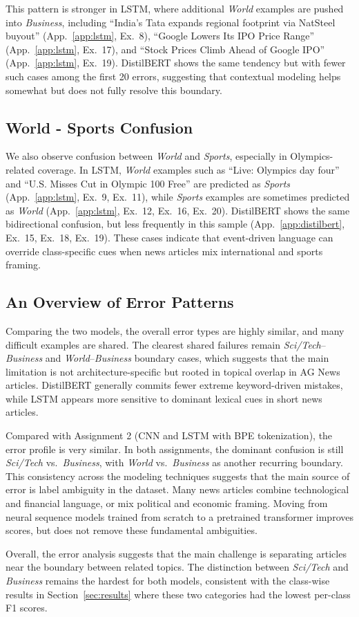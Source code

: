 This pattern is stronger in LSTM, where additional \textit{World} examples are pushed into \textit{Business}, including ``India's Tata expands regional footprint via NatSteel buyout'' (App.~\ref{app:lstm}, Ex.~8), ``Google Lowers Its IPO Price Range'' (App.~\ref{app:lstm}, Ex.~17), and ``Stock Prices Climb Ahead of Google IPO'' (App.~\ref{app:lstm}, Ex.~19). DistilBERT shows the same tendency but with fewer such cases among the first 20 errors, suggesting that contextual modeling helps somewhat but does not fully resolve this boundary.

\subsection{World - Sports Confusion}

We also observe confusion between \textit{World} and \textit{Sports}, especially in Olympics-related coverage. In LSTM, \textit{World} examples such as ``Live: Olympics day four'' and ``U.S. Misses Cut in Olympic 100 Free'' are predicted as \textit{Sports} (App.~\ref{app:lstm}, Ex.~9, Ex.~11), while \textit{Sports} examples are sometimes predicted as \textit{World} (App.~\ref{app:lstm}, Ex.~12, Ex.~16, Ex.~20). DistilBERT shows the same bidirectional confusion, but less frequently in this sample (App.~\ref{app:distilbert}, Ex.~15, Ex.~18, Ex.~19). These cases indicate that event-driven language can override class-specific cues when news articles mix international and sports framing.

\subsection{An Overview of Error Patterns}

Comparing the two models, the overall error types are highly similar, and many difficult examples are shared. The clearest shared failures remain \textit{Sci/Tech}--\textit{Business} and \textit{World}--\textit{Business} boundary cases, which suggests that the main limitation is not architecture-specific but rooted in topical overlap in AG News articles. DistilBERT generally commits fewer extreme keyword-driven mistakes, while LSTM appears more sensitive to dominant lexical cues in short news articles.

Compared with Assignment 2 (CNN and LSTM with BPE tokenization), the error profile is very similar. In both assignments, the dominant confusion is still \textit{Sci/Tech} vs.\ \textit{Business}, with \textit{World} vs.\ \textit{Business} as another recurring boundary. This consistency across the modeling techniques suggests that the main source of error is label ambiguity in the dataset. Many news articles combine technological and financial language, or mix political and economic framing. Moving from neural sequence models trained from scratch to a pretrained transformer improves scores, but does not remove these fundamental ambiguities.

Overall, the error analysis suggests that the main challenge is separating articles near the boundary between related topics. The distinction between \textit{Sci/Tech} and \textit{Business} remains the hardest for both models, consistent with the class-wise results in Section~\ref{sec:results} where these two categories had the lowest per-class F1 scores.
